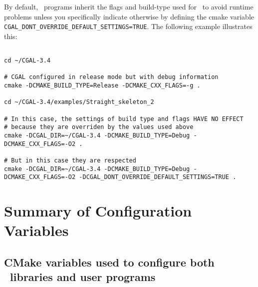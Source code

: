By default, \cgal\ programs inherit the flags and build-type used
for \cgal\ to avoid runtime problems unless you specifically indicate otherwise by
defining the cmake variable {\tt CGAL\_DONT\_OVERRIDE\_DEFAULT\_SETTINGS=TRUE}.
The following example illustrates this:

{\ccTexHtml{\scriptsize}{}
\begin{verbatim}

cd ~/CGAL-3.4

# CGAL configured in release mode but with debug information 
cmake -DCMAKE_BUILD_TYPE=Release -DCMAKE_CXX_FLAGS=-g .

cd ~/CGAL-3.4/examples/Straight_skeleton_2

# In this case, the settings of build type and flags HAVE NO EFFECT
# because they are overriden by the values used above
cmake -DCGAL_DIR=~/CGAL-3.4 -DCMAKE_BUILD_TYPE=Debug -DCMAKE_CXX_FLAGS=-O2 . 

# But in this case they are respected
cmake -DCGAL_DIR=~/CGAL-3.4 -DCMAKE_BUILD_TYPE=Debug -DCMAKE_CXX_FLAGS=-O2 -DCGAL_DONT_OVERRIDE_DEFAULT_SETTINGS=TRUE . 

\end{verbatim}
}

\section{Summary of Configuration Variables}

\subsection{CMake variables used to configure both \cgal\ libraries and user programs}

